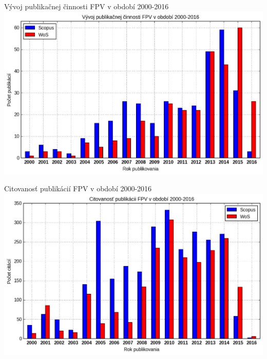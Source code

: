 \documentclass{beamer}
\begin{document}
%
%
\begin{frame}{Vývoj publikačnej činnosti FPV v období 2000-2016}
  \includegraphics[scale=0.5]{plot-all-publications-data.png}
\end{frame}

%
%
\begin{frame}{Citovanosť publikácií FPV v období 2000-2016}
  \includegraphics[scale=0.5]{plot-all-citations-data.png}
\end{frame}
\end{document}

